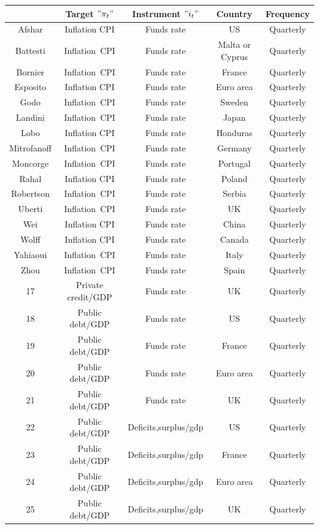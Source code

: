 \documentclass[12pt,a4paper]{article}%
\begin{document}
\begin{tabular}
[t]{|c|c|c|c|c|}\hline
& Target $"\pi_{t}"$ & Instrument $"i_{t}"$ & Country & Frequency\\\hline
Afshar & Inflation CPI & Funds rate & US & Quarterly\\\hline
Battesti & Inflation\ CPI & Funds rate & Malta or Cyprus & Quarterly\\\hline
Bornier & Inflation\ CPI & Funds rate & France & Quarterly\\\hline
Esposito & Inflation CPI & Funds rate & Euro area & Quarterly\\\hline
Godo & Inflation\ CPI & Funds rate & Sweden & Quarterly\\\hline
Landini & Inflation\ CPI & Funds rate & Japan & Quarterly\\\hline
Lobo & Inflation CPI & Funds rate & Honduras & Quarterly\\\hline
Mitrofanoff & Inflation\ CPI & Funds rate & Germany & Quarterly\\\hline
Moncorge & Inflation\ CPI & Funds rate & Portugal & Quarterly\\\hline
Rahal & Inflation CPI & Funds rate & Poland & Quarterly\\\hline
Robertson & Inflation\ CPI & Funds rate & Serbia & Quarterly\\\hline
Uberti & Inflation\ CPI & Funds rate & UK & Quarterly\\\hline
Wei & Inflation CPI & Funds rate & China & Quarterly\\\hline
Wolff & Inflation CPI & Funds rate & Canada & Quarterly\\\hline
Yahiaoui & Inflation\ CPI & Funds rate & Italy & Quarterly\\\hline
Zhou & Inflation\ CPI & Funds rate & Spain & Quarterly\\\hline
17 & Private credit/GDP & Funds rate & UK & Quarterly\\\hline
18 & Public debt/GDP & Funds rate & US & Quarterly\\\hline
19 & Public debt/GDP & Funds rate & France & Quarterly\\\hline
20 & Public debt/GDP & Funds rate & Euro area & Quarterly\\\hline
21 & Public debt/GDP & Funds rate & UK & Quarterly\\\hline
22 & Public debt/GDP & Deficits,surplus/gdp & US & Quarterly\\\hline
23 & Public debt/GDP & Deficits,surplus/gdp & France & Quarterly\\\hline
24 & Public debt/GDP & Deficits,surplus/gdp & Euro area & Quarterly\\\hline
25 & Public debt/GDP & Deficits,surplus/gdp & UK & Quarterly\\\hline
\end{tabular}
\end{document}
